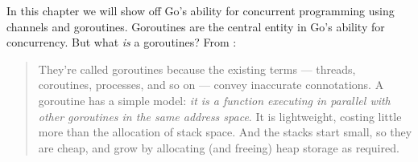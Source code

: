\noindent{}In this chapter we will show off Go's ability for
concurrent programming using channels and goroutines. Goroutines
are the central entity in Go's ability for concurrency. But what
\emph{is} a goroutines? From \cite{effective_go}:
\begin{quote}
They're called goroutines because the existing terms --- threads, coroutines,
processes, and so on --- convey inaccurate connotations. A goroutine has a simple
model: \emph{it is a function executing in parallel with other goroutines in the same
address space}. It is lightweight, costing little more than the allocation of
stack space. And the stacks start small, so they are cheap, and grow by
allocating (and freeing) heap storage as required.
\end{quote}

